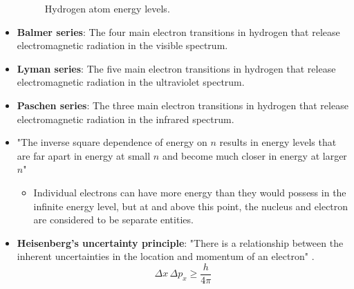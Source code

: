 \documentclass[../notes.tex]{subfiles}
\begin{document}
\begin{itemize}
\begin{figure}[h!]
        \caption{Hydrogen atom energy levels.}
        \label{fig:energyLevelH}
    \end{figure}
    \item \textbf{Balmer series}: The four main electron transitions in hydrogen that release electromagnetic radiation in the visible spectrum.
    \item \textbf{Lyman series}: The five main electron transitions in hydrogen that release electromagnetic radiation in the ultraviolet spectrum.
    \item \textbf{Paschen series}: The three main electron transitions in hydrogen that release electromagnetic radiation in the infrared spectrum.
    \item "The inverse square dependence of energy on $n$ results in energy levels that are far apart in energy at small $n$ and become much closer in energy at larger $n$" \parencite[12]{bib:MiesslerFischerTarr}
    \begin{itemize}
        \item Individual electrons can have more energy than they would possess in the infinite energy level, but at and above this point, the nucleus and electron are considered to be separate entities.
    \end{itemize}
    \item \textbf{Heisenberg's uncertainty principle}: "There is a relationship between the inherent uncertainties in the location and momentum of an electron" \parencite[14]{bib:MiesslerFischerTarr}.
    \begin{equation*}
        \Delta x\, \Delta p_x \geq \frac{h}{4\pi}
    \end{equation*}

\end{itemize}
\end{document}
